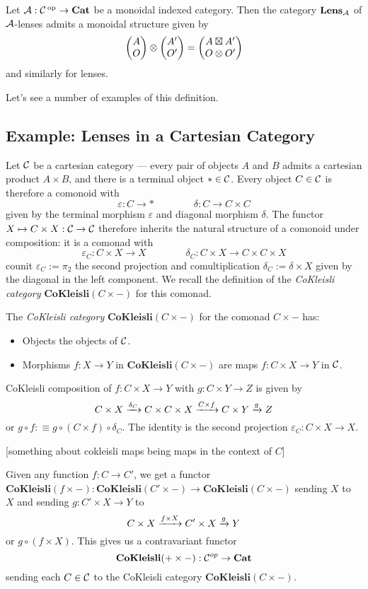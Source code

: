 \begin{defn}
Let $\operatorname{\mathcal{A}} : \operatorname{\mathcal{C}}\operatorname{^\text{op}} \to \operatorname{\textbf{Cat}}$ be a monoidal indexed category. Then the category
$\textbf{Lens}_{\operatorname{\mathcal{A}}}$ of $\operatorname{\mathcal{A}}$-lenses admits a monoidal structure given by
$$\begin{pmatrix}{A} \\ {O} \end{pmatrix} \otimes \begin{pmatrix}{A'} \\ {O'} \end{pmatrix} = \begin{pmatrix}{A \boxtimes A'} \\ {O \otimes O'} \end{pmatrix}$$
and similarly for lenses.
\end{defn}


Let's see a number of examples of this definition.
\subsection{Example: Lenses in a Cartesian Category}
Let $\operatorname{\mathcal{C}}$ be a cartesian category --- every pair of objects $A$ and $B$ admits a
cartesian product $A \times B$, and there is a terminal object $\ast \in \operatorname{\mathcal{C}}$.
Every object $C \in \operatorname{\mathcal{C}}$ is therefore a comonoid with
$$\varepsilon : C \to \ast \quad\quad\quad\quad \delta : C \to C \times C$$
given by the terminal morphism $\varepsilon$ and diagonal morphism $\delta$. The
functor $X \mapsto C \times X : \operatorname{\mathcal{C}} \to \operatorname{\mathcal{C}}$ therefore inherits the natural
structure of a comonoid under composition: it is a comonad with
$$\varepsilon_C : C \times X \to X \quad\quad\quad\quad \delta_C : C \times X \to C
\times C \times X$$
counit $\varepsilon_C := \pi_2$ the second projection and comultiplication
$\delta_C := \delta \times X$ given by the diagonal in the left component. We
recall the definition of the \emph{CoKleisli category} $\textbf{CoKleisli}(C
\times -)$ for this comonad.
\begin{defn}
The \emph{CoKleisli category} $\textbf{CoKleisli}(C \times -)$ for the comonad
$C \times -$ has:
\begin{itemize}
\item Objects the objects of $\operatorname{\mathcal{C}}$.
  \item Morphisms $f : X \to Y$ in $\textbf{CoKleisli}(C \times -)$ are maps $f : C \times X \to Y$ in $\operatorname{\mathcal{C}}$.
\end{itemize}

CoKleisli composition of $f : C
\times X \to Y$ with $g : C \times Y \to Z$ is given by
$$C \times X \xrightarrow{\delta_C} C \times C \times X \xrightarrow{C \times f} C \times Y
\xrightarrow{g} Z$$
or $g \circ f :\equiv g \circ (C \times f) \circ \delta_C$. The identity is the
second projection $\varepsilon_C : C \times X \to X$.
\end{defn}
[something about cokleisli maps being maps in the context of $C$]

Given any function $f : C \to C'$, we get a functor $\textbf{CoKleisli}(f \times
-) : \textbf{CoKleisli}(C' \times -) \to \textbf{CoKleisli}(C \times -)$ sending
$X$ to $X$ and sending $g : C' \times X \to Y$ to
$$C \times X \xrightarrow{f \times X} C'\times X \xrightarrow{g} Y$$
or $g \circ (f \times X)$. This gives us a contravariant functor
$$\textbf{CoKleisli}(+ \times -) : \operatorname{\mathcal{C}}^{op} \to \operatorname{\textbf{Cat}}$$
sending each $C \in \operatorname{\mathcal{C}}$ to the CoKleisli category $\textbf{CoKleisli}(C \times -)$.

